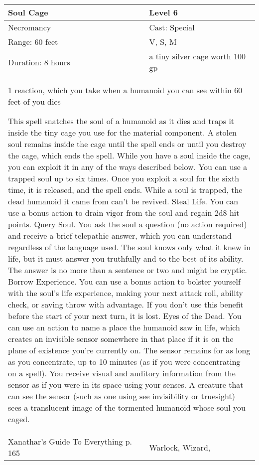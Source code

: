 \documentclass[11pt]{report}
\begin{document}
\begin{table}[H]
	\begin{tabular}{||p{6cm}|p{6cm}||}
		\hline\hline
		\bf{Soul Cage} & Level 6\\ \hline
		Necromancy & Cast: Special\\ \hline
		Range: 60 feet & V, S, M\\ \hline
		Duration: 8 hours & a tiny silver cage worth 100 gp\\ \hline
		\multicolumn{2}{||p{12cm}||}{1 reaction, which you take when a humanoid you can see within 60 feet of you dies

This spell snatches the soul of a humanoid as it dies and traps it inside the tiny cage you use for the material component. A stolen soul remains inside the cage until the spell ends or until you destroy the cage, which ends the spell. While you have a soul inside the cage, you can exploit it in any of the ways described below. You can use a trapped soul up to six times. Once you exploit a soul for the sixth time, it is released, and the spell ends. While a soul is trapped, the dead humanoid it came from can’t be revived.
Steal Life. You can use a bonus action to drain vigor from the soul and regain 2d8 hit points.
Query Soul. You ask the soul a question (no action required) and receive a brief telepathic answer, which you can understand regardless of the language used. The soul knows only what it knew in life, but it must answer you truthfully and to the best of its ability. The answer is no more than a sentence or two and might be cryptic.
Borrow Experience. You can use a bonus action to bolster yourself with the soul’s life experience, making your next attack roll, ability check, or saving throw with advantage. If you don’t use this benefit before the start of your next turn, it is lost.
Eyes of the Dead. You can use an action to name a place the humanoid saw in life, which creates an invisible sensor somewhere in that place if it is on the plane of existence you’re currently on. The sensor remains for as long as you concentrate, up to 10 minutes (as if you were concentrating on a spell). You receive visual and auditory information from the sensor as if you were in its space using your senses.
A creature that can see the sensor (such as one using see invisibility or truesight) sees a translucent image of the tormented humanoid whose soul you caged.}\\ \hline
Xanathar's Guide To Everything p. 165 & Warlock, Wizard, \\ \hline\hline
	\end{tabular}
\end{table}
\end{document}
